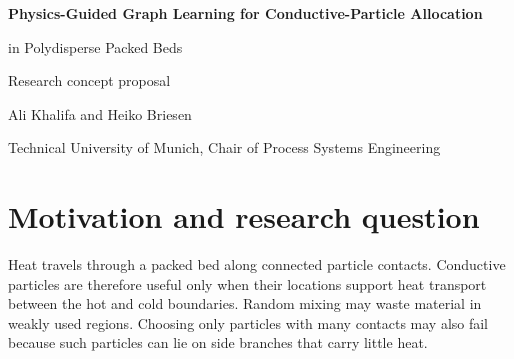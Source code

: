 \documentclass[10pt,a4paper]{article}
\begin{document}
\begin{center}
{\Large\bfseries\color{titleblue}Physics-Guided Graph Learning for Conductive-Particle Allocation\par
in Polydisperse Packed Beds\par}
\vspace{0.7em}
{\normalsize Research concept proposal\par}
\vspace{0.25em}
{\small Ali Khalifa and Heiko Briesen\par
Technical University of Munich, Chair of Process Systems Engineering\par}
\end{center}
\vspace{0.45em}

\begin{abstract}
Heat transfer through particle beds is important in many natural and industrial systems, including the heating, cooling, drying and temperature control of granular materials, as well as thermal-energy storage. Adding a small amount of highly
conductive material may help, but its location can be as important as its
amount. This study asks where conductive particles should be placed when the
packing geometry, porosity, particle-size distribution and conductive-material
volume must remain fixed. DEM will generate mechanically valid packings. A
steady thermal-network solver will test candidate material allocations, while
a repeated swap search will create strong reference solutions. A graph neural
network (GNN) will then learn which particles are useful within the contact
network. For a new packing, it will rank the particles that should receive the
limited high-conductivity material. One final thermal solve will verify the
proposed allocation. The study will test whether this fast graph-based rule can
outperform random placement and simple physics-based rankings while avoiding
most of the repeated search.
\end{abstract}

\section{Motivation and research question}
Heat travels through a packed bed along connected particle contacts. Conductive
particles are therefore useful only when their locations support heat transport
between the hot and cold boundaries. Random mixing may waste material in weakly
used regions. Choosing only particles with many contacts may also fail because
such particles can lie on side branches that carry little heat.
\end{document}

